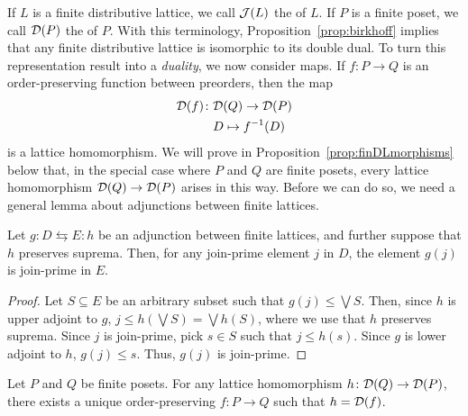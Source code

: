 If $L$ is a finite distributive lattice, we call $\mathcal{J}(L)$ the  of $L$. If $P$ is a finite poset, we call $\mathcal{D}(P)$ the  of $P$. With this terminology, Proposition~\ref{prop:birkhoff} implies that any finite distributive lattice is isomorphic to its double dual.
To turn this representation result into a \emph{duality}, we now consider maps. If $f \colon P \to Q$ is an order-preserving function between preorders, then the  map
\begin{align*}
\mathcal{D}(f) \colon &\mathcal{D}(Q) \to \mathcal{D}(P) \\
&D \mapsto f^{-1}(D)
\end{align*}
is a lattice homomorphism.  We will prove in Proposition~\ref{prop:finDLmorphisms} below that, in the special case where $P$ and $Q$ are finite posets, every lattice homomorphism $\mathcal{D}(Q) \to \mathcal{D}(P)$ arises in this way. Before we can do so, we need a general lemma about adjunctions between finite lattices.
\begin{lemma}\label{lem:loweradj-preserves-joinprime}
Let $g \colon D \leftrightarrows E \colon h$ be an adjunction between finite lattices, and further suppose that $h$ preserves suprema. Then, for any join-prime element $j$ in $D$, the element $g(j)$ is join-prime in $E$.
\end{lemma}
\begin{proof}
Let $S \subseteq E$ be an arbitrary subset such that $g(j) \leq \bigvee S$. Then, since $h$ is upper adjoint to $g$, $j \leq h(\bigvee S) = \bigvee h(S)$, where we use that $h$ preserves suprema. Since $j$ is join-prime, pick $s \in S$ such that $j \leq h(s)$. Since $g$ is lower adjoint to $h$, $g(j) \leq s$. Thus, $g(j)$ is join-prime.
\end{proof}
\begin{proposition}\label{prop:finDLmorphisms}
Let $P$ and $Q$ be finite posets. For any lattice homomorphism $h \colon \mathcal{D}(Q) \to \mathcal{D}(P)$, there exists a unique order-preserving $f \colon P \to Q$ such that $h = \mathcal{D}(f)$.
\end{proposition}
